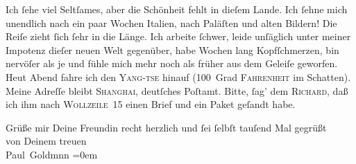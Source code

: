 \pstart
           Ich ſehe viel Seltſames, aber die Schönheit fehlt in dieſem Lande. Ich ſehne mich unendlich nach ein
               paar Wochen Italien, nach Paläſten und alten
               Bildern! {\pb}Die Reiſe zieht ſich ſehr in die Länge.
               Ich arbeite ſchwer, leide unſäglich unter meiner Impotenz\strikeout{,} dieſer neuen Welt gegenüber, habe Wochen lang Kopfſchmerzen, bin nervöſer
               als je und fühle mich\strikeout{,} mehr noch als früher aus dem
               Geleiſe geworfen. Heut{ }Abend fahre ich den \textsc{Yang-tse} hinauf (100 Grad \textsc{Fahrenheit} im Schatten). Meine
               Adreſſe bleibt \textsc{Shanghai}, {\pb}deutſches Poſtamt. Bitte,
               ſag’ dem \textsc{Richard}, daß ich ihm nach \textsc{Wollzeile} 15 einen Brief und ein Paket geſandt
               habe. \pend
           
\pstart
            Grüße mir Deine Freundin recht herzlich und ſei ſelbſt tauſend Mal gegrüßt {\\[\baselineskip]}von Deinem treuen{\\[\baselineskip]}\spacefill\mbox{Paul Goldmnn}\pend
           \leftskip=0em{}\endnumbering{}  
      